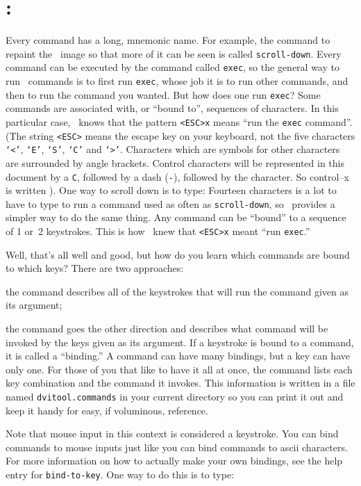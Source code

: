 \section{:}
Every command has a long, mnemonic name.  For example, the
command to repaint the \DVI\ image so that more of it can be seen is
called {\tt scroll-down}.  Every command can be executed by the command
called {\tt exec}, so the general way to run \dtl\ commands is to first
run {\tt exec}, whose job it is to run other commands, and then to run
the command you wanted.  But how does one run {\tt exec}?  Some
commands are associated with, or ``bound to'', sequences of characters.
In this particular case, \dtl\
knows that the pattern {\tt <ESC>x} means ``run the {\tt exec}
command''.  (The string {\tt <ESC>} means the escape key on your
keyboard, not the five characters 
{\tt `<'},
{\tt `E'},
{\tt `S'},
{\tt `C'} and
{\tt `>'}.
Characters which are symbols for other characters are surrounded by
angle brackets.
Control characters will be represented in this document by a {\tt C},
followed by a dash ({\tt -}), followed by the character.  So control--x
is written {\tt <C-X>}).
One way to scroll down is to type:
Fourteen characters is a lot to have to type to run a command used as
often as {\tt scroll-down}, so \dtl\ provides a simpler way to do the
same thing.
Any command can be ``bound'' to a sequence of 1 or~2 keystrokes.  
This is how \dtl\ knew that {\tt <ESC>x} meant ``run {\tt exec}.''

Well, that's all well and good, but how do you learn which commands are
bound to which keys?  There are two approaches:
\item the command
{\tt {}} describes all of the keystrokes that will run the
command given as its argument;
\item the command
{\tt {}} goes the other direction and describes
what command will be invoked by the keys given as its argument.  
\hfil\break
If a keystroke is bound to a command, it is called a ``binding.'' A
command can have many bindings, but a key can have only one.
For
those of you that like to have it all at once, the command
{\tt {}} lists each key combination and the
command it invokes.  This information is written in a file
named {\tt dvitool.commands} in your current directory
so you can print it out and keep it handy for easy,
if voluminous, reference.

Note that mouse input in this context is considered a keystroke.  You
can bind commands to mouse inputs just like you can bind commands to
ascii characters.  For more information on how to actually make your
own bindings, see the help entry for {\tt bind-to-key}.
One way to do this is to type:

